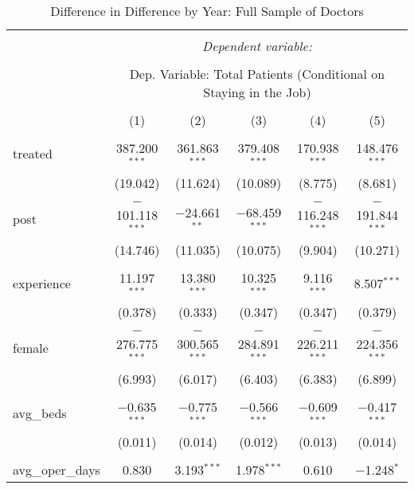 
\begin{table}[!htbp] \centering 
  \caption{Difference in Difference by Year: Full Sample of Doctors} 
  \label{} 
\scriptsize 
\begin{tabular}{@{\extracolsep{0pt}}lccccc} 
\\[-1.8ex]\hline 
\hline \\[-1.8ex] 
 & \multicolumn{5}{c}{\textit{Dependent variable:}} \\ 
\cline{2-6} 
\\[-1.8ex] & \multicolumn{5}{c}{Dep. Variable: Total Patients (Conditional on Staying in the Job)} \\ 
\\[-1.8ex] & (1) & (2) & (3) & (4) & (5)\\ 
\hline \\[-1.8ex] 
 treated & 387.200$^{***}$ & 361.863$^{***}$ & 379.408$^{***}$ & 170.938$^{***}$ & 148.476$^{***}$ \\ 
  & (19.042) & (11.624) & (10.089) & (8.775) & (8.681) \\ 
  & & & & & \\ 
 post & $-$101.118$^{***}$ & $-$24.661$^{**}$ & $-$68.459$^{***}$ & $-$116.248$^{***}$ & $-$191.844$^{***}$ \\ 
  & (14.746) & (11.035) & (10.075) & (9.904) & (10.271) \\ 
  & & & & & \\ 
 experience & 11.197$^{***}$ & 13.380$^{***}$ & 10.325$^{***}$ & 9.116$^{***}$ & 8.507$^{***}$ \\ 
  & (0.378) & (0.333) & (0.347) & (0.347) & (0.379) \\ 
  & & & & & \\ 
 female & $-$276.775$^{***}$ & $-$300.565$^{***}$ & $-$284.891$^{***}$ & $-$226.211$^{***}$ & $-$224.356$^{***}$ \\ 
  & (6.993) & (6.017) & (6.403) & (6.383) & (6.899) \\ 
  & & & & & \\ 
 avg\_beds & $-$0.635$^{***}$ & $-$0.775$^{***}$ & $-$0.566$^{***}$ & $-$0.609$^{***}$ & $-$0.417$^{***}$ \\ 
  & (0.011) & (0.014) & (0.012) & (0.013) & (0.014) \\ 
  & & & & & \\ 
 avg\_oper\_days & 0.830 & 3.193$^{***}$ & 1.978$^{***}$ & 0.610 & $-$1.248$^{*}$ \\ 

\end{tabular}
\end{table}
